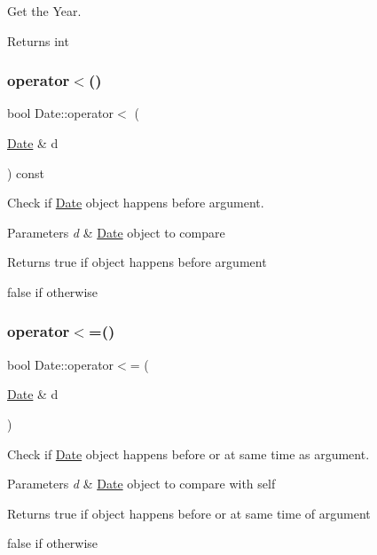 Get the Year. 

\begin{DoxyReturn}{Returns}
int 
\end{DoxyReturn}
\mbox{\label{classDate_a6523cc8b3f5e669fe37a6976a27737d5}} 
\subsubsection{\texorpdfstring{operator$<$()}{operator<()}}
{\footnotesize\ttfamily bool Date\+::operator$<$ (\begin{DoxyParamCaption}\item[{\mbox{\hyperlink{classDate}{Date}} \&}]{d }\end{DoxyParamCaption}) const}



Check if \mbox{\hyperlink{classDate}{Date}} object happens before argument. 


\begin{DoxyParams}{Parameters}
{\em d} & \mbox{\hyperlink{classDate}{Date}} object to compare \\
\hline
\end{DoxyParams}
\begin{DoxyReturn}{Returns}
true if object happens before argument 

false if otherwise 
\end{DoxyReturn}
\mbox{\label{classDate_a49b4e0ed6752c928164fd483720423da}} 
\subsubsection{\texorpdfstring{operator$<$=()}{operator<=()}}
{\footnotesize\ttfamily bool Date\+::operator$<$= (\begin{DoxyParamCaption}\item[{\mbox{\hyperlink{classDate}{Date}} \&}]{d }\end{DoxyParamCaption})}



Check if \mbox{\hyperlink{classDate}{Date}} object happens before or at same time as argument. 


\begin{DoxyParams}{Parameters}
{\em d} & \mbox{\hyperlink{classDate}{Date}} object to compare with self \\
\hline
\end{DoxyParams}
\begin{DoxyReturn}{Returns}
true if object happens before or at same time of argument 

false if otherwise 
\end{DoxyReturn}
\mbox{\label{classDate_a91ccc0361527f5f68785c5460d750a12}} 
